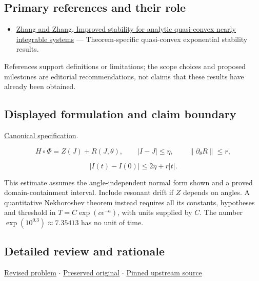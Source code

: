 \documentclass[
  11pt,
]{article}
\providecommand{\tightlist}{%
  \setlength{\itemsep}{0pt}\setlength{\parskip}{0pt}}
\begin{document}
\subsection{Primary references and their role}

\begin{itemize}
\tightlist
\item
  \href{https://arxiv.org/abs/1701.06026}{Zhang and Zhang, Improved
  stability for analytic quasi-convex nearly integrable systems} ---
  Theorem-specific quasi-convex exponential stability results.
\end{itemize}

References support definitions or limitations; the scope choices and
proposed milestones are editorial recommendations, not claims that these
results have already been obtained.

\subsection{Displayed formulation and claim boundary}

\href{https://github.com/rick-stevens-ai/Pure-Thought/blob/main/PRDs/28-Nekhoroshev-Stability-Theory.md}{Canonical
specification}.

\[H\circ\Phi=Z(J)+R(J,\theta),\qquad
|I-J|\le\eta,\qquad\|\partial_\theta R\|\le r,\]

\[|I(t)-I(0)|\le2\eta+r|t|.\]

This estimate assumes the angle-independent normal form shown and a
proved domain-containment interval. Include resonant drift if \(Z\)
depends on angles. A quantitative Nekhoroshev theorem instead requires
all its constants, hypotheses and threshold in
\(T=C\exp(c\epsilon^{-a})\), with units supplied by \(C\). The number
\(\exp(10^{0.3})\approx7.35413\) has no unit of time.

\subsection{Detailed review and rationale}

\href{https://github.com/rick-stevens-ai/Pure-Thought/blob/main/PRDs/28-Nekhoroshev-Stability-Theory.md}{Revised
problem} \ensuremath{\cdot}
\href{https://github.com/rick-stevens-ai/Pure-Thought/blob/main/archive/original-PRDs/28-Nekhoroshev-Stability-Theory.md}{Preserved
original} \ensuremath{\cdot}
\href{https://github.com/rick-stevens-ai/Pure-Thought/blob/f854d4e12b55c1f5b5c2a964b75f2d23496d981e/PRDs/28-Nekhoroshev-Stability-Theory.md}{Pinned
upstream source}
\end{document}
